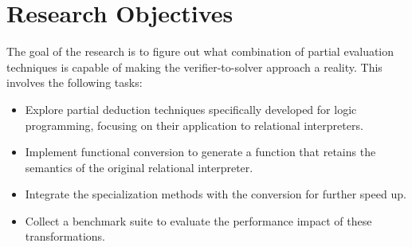 \section{Research Objectives}

The goal of the research is to figure out what combination of partial evaluation techniques is
capable of making the verifier-to-solver approach a reality.
This involves the following tasks: 

\begin{itemize}
  \item Explore partial deduction techniques specifically developed for logic programming, focusing on their application to relational interpreters. 
  \item Implement functional conversion to generate a function that retains the semantics of the original relational interpreter. 
  \item Integrate the specialization methods with the conversion for further speed up. 
  \item Collect a benchmark suite to evaluate the performance impact of these transformations. 
\end{itemize}